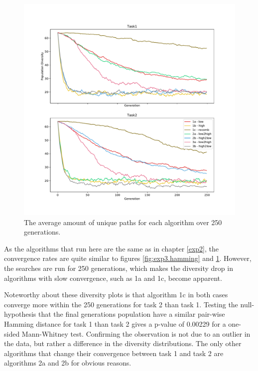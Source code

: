 \begin{figure}[!ht]
    \includegraphics[width=\textwidth, center]{Chapters/4.Experiments/exp3/figures/diversity_frequency.pdf}
    \caption[Frequency diversity plot]{The average amount of unique paths for each algorithm over 250 generations.}
    \label{fig:exp3.frequency}
\end{figure}

As the algorithms that run here are the same as in chapter \ref{exp2}, the convergence rates are quite similar to figures \ref{fig:exp3.hamming} and \ref{fig:exp3.frequency}. However, the searches are run for 250 generations, which makes the diversity drop in algorithms with slow convergence, such as 1a and 1c, become apparent. 

Noteworthy about these diversity plots is that algorithm 1c in both cases converge more within the 250 generations for task 2 than task 1. Testing the null-hypothesis that the final generations population have a similar pair-wise Hamming distance for task 1 than task 2 gives a p-value of 0.00229 for a one-sided Mann-Whitney test. Confirming the observation is not due to an outlier in the data, but rather a difference in the diversity distributions. The only other algorithms that change their convergence between task 1 and task 2 are algorithms 2a and 2b for obvious reasons.  

